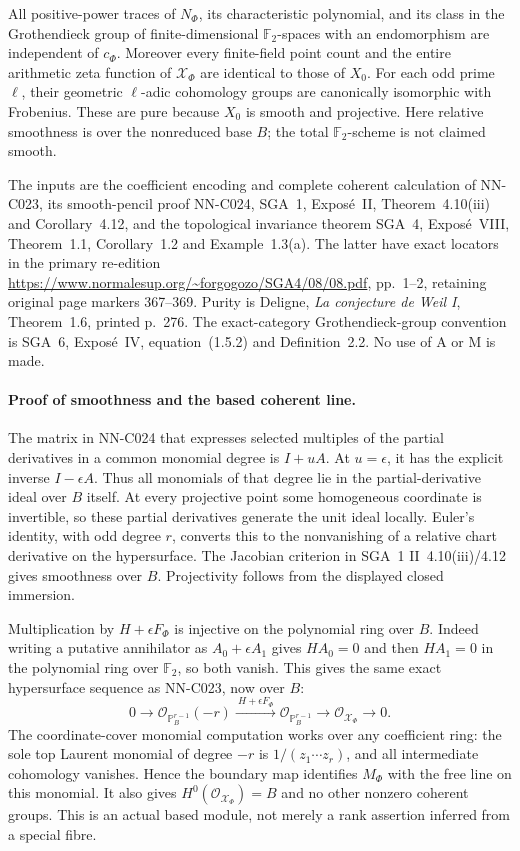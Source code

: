 All positive-power traces of $N_\Phi$, its characteristic polynomial,
and its class in the Grothendieck group of finite-dimensional
$\mathbb F_2$-spaces with an endomorphism are independent of $c_\Phi$.
Moreover every finite-field point count and the entire arithmetic zeta
function of $\mathcal X_\Phi$ are identical to those of $X_0$.
For each odd prime $\ell$, their geometric $\ell$-adic cohomology groups
are canonically isomorphic with Frobenius. These are pure because $X_0$
is smooth and projective. Here relative smoothness is over the
nonreduced base $B$; the total $\mathbb F_2$-scheme is not claimed smooth.

The inputs are the coefficient encoding and complete coherent calculation
of NN-C023, its smooth-pencil proof NN-C024, SGA~1, Expos\'e~II,
Theorem~4.10(iii) and Corollary~4.12, and the topological invariance
theorem SGA~4, Expos\'e~VIII, Theorem~1.1, Corollary~1.2 and
Example~1.3(a). The latter have exact locators in the primary re-edition
\url{https://www.normalesup.org/~forgogozo/SGA4/08/08.pdf},
pp.~1--2, retaining original page markers 367--369.
Purity is Deligne, \emph{La conjecture de Weil I}, Theorem~1.6,
printed p.~276. The exact-category Grothendieck-group convention is
SGA~6, Expos\'e~IV, equation~(1.5.2) and Definition~2.2.
No use of A or M is made.

\paragraph{Proof of smoothness and the based coherent line.}
The matrix in NN-C024 that expresses selected multiples of the partial
derivatives in a common monomial degree is $I+uA$. At $u=\epsilon$,
it has the explicit inverse $I-\epsilon A$. Thus all monomials of
that degree lie in the partial-derivative ideal over $B$ itself.
At every projective point some homogeneous coordinate is invertible,
so these partial derivatives generate the unit ideal locally.
Euler's identity, with odd degree $r$, converts this to the
nonvanishing of a relative chart derivative on the hypersurface.
The Jacobian criterion in SGA~1 II~4.10(iii)/4.12 gives smoothness
over $B$. Projectivity follows from the displayed closed immersion.

Multiplication by $H+\epsilon F_\Phi$ is injective on the polynomial
ring over $B$. Indeed writing a putative annihilator as
$A_0+\epsilon A_1$ gives $HA_0=0$ and then $HA_1=0$ in the
polynomial ring over $\mathbb F_2$, so both vanish. This gives
the same exact hypersurface sequence as NN-C023, now over $B$:
\[
 0\longrightarrow\mathcal O_{\mathbb P^{r-1}_B}(-r)
   \xrightarrow{\ H+\epsilon F_\Phi\ }
     \mathcal O_{\mathbb P^{r-1}_B}
   \longrightarrow\mathcal O_{\mathcal X_\Phi}\longrightarrow0.
\]
The coordinate-cover monomial computation works over any coefficient
ring: the sole top Laurent monomial of degree $-r$ is
$1/(z_1\cdots z_r)$, and all intermediate cohomology vanishes.
Hence the boundary map identifies $M_\Phi$ with the free line
on this monomial. It also gives $H^0(\mathcal O_{\mathcal X_\Phi})=B$
and no other nonzero coherent groups. This is an actual based module,
not merely a rank assertion inferred from a special fibre.

